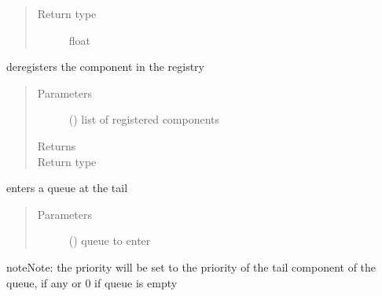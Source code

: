 \documentclass[letterpaper,10pt,english]{sphinxmanual}
\begin{document}
\begin{fulllineitems}
\begin{fulllineitems}
\begin{quote}
\begin{description}
\item[{Return type}] \leavevmode
float

\end{description}\end{quote}

\end{fulllineitems}


\begin{fulllineitems}
\label{\detokenize{Reference:salabim.Component.deregister}}
deregisters the component in the registry
\begin{quote}\begin{description}
\item[{Parameters}] \leavevmode
{} () \textendash{} list of registered components

\item[{Returns}] \leavevmode
{}

\item[{Return type}] \leavevmode
{\hyperref[\detokenize{Reference:salabim.Component}]{}}

\end{description}\end{quote}

\end{fulllineitems}


\begin{fulllineitems}
\label{\detokenize{Reference:salabim.Component.enter}}
enters a queue at the tail
\begin{quote}\begin{description}
\item[{Parameters}] \leavevmode
{} ({\hyperref[\detokenize{Reference:salabim.Queue}]{}}) \textendash{} queue to enter

\end{description}\end{quote}

\begin{sphinxadmonition}{note}{Note:}
the priority will be set to
the priority of the tail component of the queue, if any
or 0 if queue is empty
\end{sphinxadmonition}


\end{fulllineitems}
\end{fulllineitems}
\end{document}
